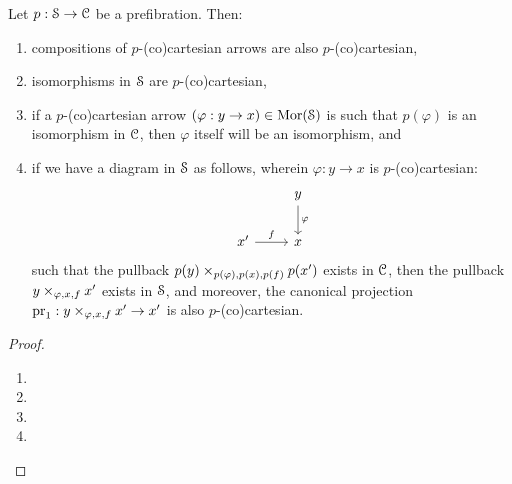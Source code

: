             \begin{proposition} \label{prop: properties_of_(co)cartesian_arrows_in_a_prefibration}
                Let $p: \S \to \C$ be a prefibration. Then:
                    \begin{enumerate}
                        \item compositions of $p$-(co)cartesian arrows are also $p$-(co)cartesian,
                        \item isomorphisms in $\S$ are $p$-(co)cartesian, 
                        \item if a $p$-(co)cartesian arrow $(\varphi: y \to x) \in \Mor(\S)$ is such that $p(\varphi)$ is an isomorphism in $\C$, then $\varphi$ itself will be an isomorphism, and
                        \item if we have a diagram in $\S$ as follows, wherein $\varphi: y \to x$ is $p$-(co)cartesian:
                            $$
                                \begin{tikzcd}
                                	& y \\
                                	{x'} & x
                                	\arrow["\varphi", from=1-2, to=2-2]
                                	\arrow["f", from=2-1, to=2-2]
                                \end{tikzcd}
                            $$
                        such that the pullback $p(y) \x_{p(\varphi), p(x), p(f)} p(x')$ exists in $\C$, then the pullback $y \x_{\varphi, x, f} x'$ exists in $\S$, and moreover, the canonical projection $\pr_1: y \x_{\varphi, x, f} x' \to x'$ is also $p$-(co)cartesian.
                    \end{enumerate}
            \end{proposition}
                \begin{proof}
                    \noindent
                    \begin{enumerate}
                        \item 
                        \item 
                        \item 
                        \item 
                    \end{enumerate}
                \end{proof}
